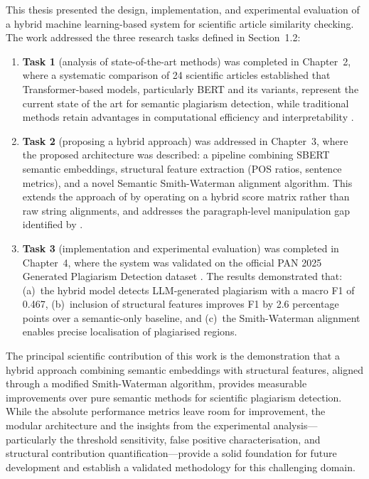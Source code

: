 \documentclass[12pt, a4paper]{article}
\begin{document}
This thesis presented the design, implementation, and experimental evaluation of a hybrid machine learning-based system for scientific article similarity checking. The work addressed the three research tasks defined in Section~1.2:

\begin{enumerate}
	\item \textbf{Task 1} (analysis of state-of-the-art methods) was completed in Chapter~2, where a systematic comparison of 24 scientific articles established that Transformer-based models, particularly BERT and its variants, represent the current state of the art for semantic plagiarism detection, while traditional methods retain advantages in computational efficiency and interpretability \citep{Antonius2023, ElRashidy2024}.

	\item \textbf{Task 2} (proposing a hybrid approach) was addressed in Chapter~3, where the proposed architecture was described: a pipeline combining SBERT semantic embeddings, structural feature extraction (POS ratios, sentence metrics), and a novel Semantic Smith-Waterman alignment algorithm. This extends the approach of \citet{Antonius2023} by operating on a hybrid score matrix rather than raw string alignments, and addresses the paragraph-level manipulation gap identified by \citet{Saqaabi2025}.

	\item \textbf{Task 3} (implementation and experimental evaluation) was completed in Chapter~4, where the system was validated on the official PAN 2025 Generated Plagiarism Detection dataset \citep{GreinerPetter2025}. The results demonstrated that: (a)~the hybrid model detects LLM-generated plagiarism with a macro F1 of 0.467, (b)~inclusion of structural features improves F1 by 2.6 percentage points over a semantic-only baseline, and (c)~the Smith-Waterman alignment enables precise localisation of plagiarised regions.
\end{enumerate}

The principal scientific contribution of this work is the demonstration that a hybrid approach combining semantic embeddings with structural features, aligned through a modified Smith-Waterman algorithm, provides measurable improvements over pure semantic methods for scientific plagiarism detection. While the absolute performance metrics leave room for improvement, the modular architecture and the insights from the experimental analysis---particularly the threshold sensitivity, false positive characterisation, and structural contribution quantification---provide a solid foundation for future development and establish a validated methodology for this challenging domain.
\end{document}
